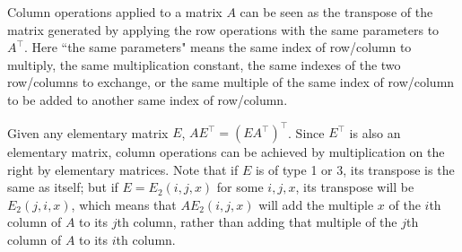 \begin{exercise}{11}
Column operations applied to a matrix $A$ can be seen as the transpose of the matrix generated by applying the row operations with the same parameters to $A^{\top}$. Here ``the same parameters" means the same index of row/column to multiply, the same multiplication constant, the same indexes of the two row/columns to exchange, or the same multiple of the same index of row/column to be added to another same index of row/column.

Given any elementary matrix $E$, $AE^{\top} = (EA^{\top})^{\top}$. Since $E^{\top}$ is also an elementary matrix, column operations can be achieved by multiplication on the right by elementary matrices. Note that if $E$ is of type 1 or 3, its transpose is the same as itself; but if $E = E_2(i,j,x)$ for some $i, j, x$, its transpose will be $E_2(j,i,x)$, which means that $AE_2(i,j,x)$ will add the multiple $x$ of the $i$th column of $A$ to its $j$th column, rather than adding that multiple of the $j$th column of $A$ to its $i$th column. \rQED
\end{exercise}

